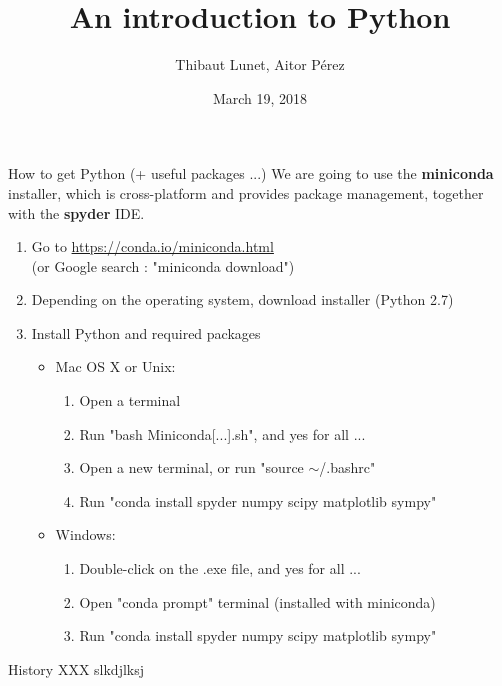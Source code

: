 \documentclass[11pt,unknownkeysallowed,usenames,dvipsnames]{beamer}
\title{An introduction to Python}
\author{Thibaut Lunet, Aitor Pérez}
\date{March 19, 2018}
\begin{document}
	\maketitle
	
   	\begin{frame}{How to get Python (+ useful packages ...)}
        We are going to use the \textbf{miniconda} installer, which is cross-platform and provides package management, together with the \textbf{spyder} IDE.
        
        \begin{enumerate}
            \item Go to \href{https://conda.io/miniconda.html}{https://conda.io/miniconda.html} \\ (or Google search : "miniconda download")
            \item Depending on the operating system, download installer (Python 2.7)
            \item Install Python and required packages
            \begin{itemize}
                \item Mac OS X or Unix:
                \begin{enumerate}
                    \item Open a terminal
                    \item Run "bash Miniconda[...].sh", and yes for all ...
                    \item Open a new terminal, or run "source $\sim$/.bashrc"
                    \item Run "conda install spyder numpy scipy matplotlib sympy"
                \end{enumerate}
                \item Windows:
                \begin{enumerate}
                    \item Double-click on the .exe file, and yes for all ...
                    \item Open "conda prompt" terminal (installed with miniconda)
                    \item Run "conda install spyder numpy scipy matplotlib sympy"
                \end{enumerate}
            \end{itemize}
        \end{enumerate}
    \end{frame}
    
	\begin{frame}{History}
		XXX slkdjlksj
	\end{frame}
\end{document}
